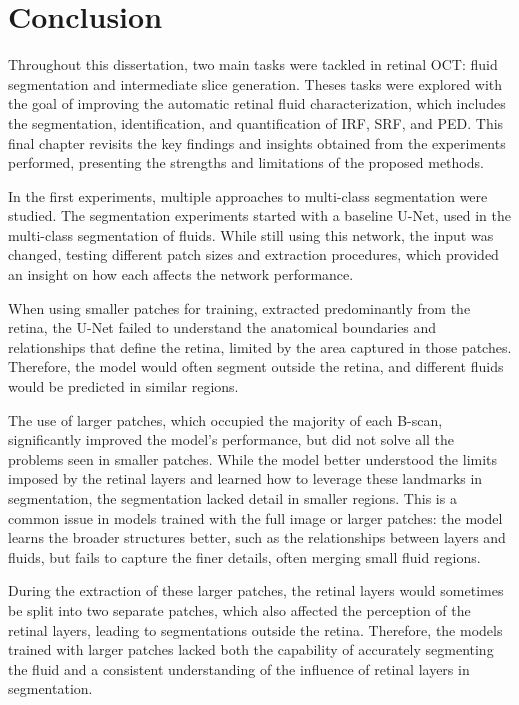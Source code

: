 \chapter{Conclusion}\label{Conclusion}

Throughout this dissertation, two main tasks were tackled in retinal OCT: fluid segmentation and intermediate slice generation. Theses tasks were explored with the goal of improving the automatic retinal fluid characterization, which includes the segmentation, identification, and quantification of IRF, SRF, and PED. This final chapter revisits the key findings and insights obtained from the experiments performed, presenting the strengths and limitations of the proposed methods.
\par
In the first experiments, multiple approaches to multi-class segmentation were studied. The segmentation experiments started with a baseline U-Net, used in the multi-class segmentation of fluids. While  still using this network, the input was changed, testing different patch sizes and extraction procedures, which provided an insight on how each affects the network performance.
\par
When using smaller patches for training, extracted predominantly from the retina, the U-Net failed to understand the anatomical boundaries and relationships that define the retina, limited by the area captured in those patches. Therefore, the model would often segment outside the retina, and different fluids would be predicted in similar regions.
\par
The use of larger patches, which occupied the majority of each B-scan, significantly improved the model's performance, but did not solve all the problems seen in smaller patches. While the model better understood the limits imposed by the retinal layers and learned how to leverage these landmarks in segmentation, the segmentation lacked detail in smaller regions. This is a common issue in models trained with the full image or larger patches: the model learns the broader structures better, such as the relationships between layers and fluids, but fails to capture the finer details, often merging small fluid regions.
\par
During the extraction of these larger patches, the retinal layers would sometimes be split into two separate patches, which also affected the perception of the retinal layers, leading to segmentations outside the retina. Therefore, the models trained with larger patches lacked both the capability of accurately segmenting the fluid and a consistent understanding of the influence of retinal layers in segmentation.
